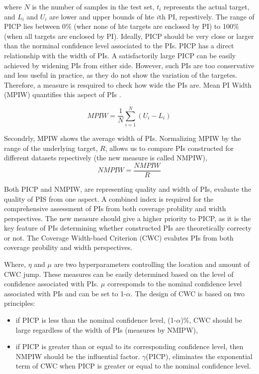 \documentclass[review]{elsarticle}
\begin{document}
      where $N$ is the number of samples in the test set, $t_{i}$ represents the actual target, and $L_{i}$ and $U_{i}$ are lower and upper bounds of hte $i$th PI, repestively. The range of PICP lies between 0$\%$ (wher none of hte targets are enclosed by PI) to 100$\%$ (when all targets are enclosed by PI). Ideally, PICP should be very close or larger than the norminal confidence level associated to the PIs.
      PICP has a direct relationship with the width of PIs. A satisfactorily large PICP can be easily achieved by widening PIs from either side. However, such PIs are too conservative and less useful in practice, as they do not show the variation of the targetes. Therefore, a measure is resquired to check how wide the PIs are. Mean PI Width (MPIW) quantifies this aspect of PIs \cite{Khosravi2010}.

      \begin{equation}
        MPIW = \frac{1}{N} \sum_{i=1}^{N} (U_{i}-L_{i})
        \label{eq.MPIW}
      \end{equation}

      Secondrly, MPIW shows the average width of PIs. Normalizing MPIW by the range of the underlying target, $R$, allows us to compare PIs constructed for different datasets repectively (the new measure is called NMPIW),
      \begin{equation}
        NMPIW = \frac{NMPIW}{R}
        \label{eq.NMPIW}
      \end{equation}

      Both PICP and NMPIW, are representing quality and width of PIs, evaluate the quality of PIS from one aspect. A combined index is required for the comprehensive assessment of PIs from both coverage probility and width perspectives. The new measure should give a higher priority to PICP, as it is the key feature of PIs determining whether constructed PIs are theoretically correcty or not. The Coverage Width-baed Criterion (CWC) evalutes PIs from both coverage probility and width perspectives.

      Where, $\eta$ and $\mu$ are two hyperparameters controlling the location and amount of CWC jump. These measures can be easily determined based on the level of confidence associated with PIs. $\mu$ correspomds to the nominal confidence level associated with PIs and can be set to 1-$\alpha$. The design of CWC is based on two principles:

      \begin{itemize}
        \item if PICP is less than the nominal confidence level, (1-$\alpha$)$\%$, CWC should be large regardless of the width of PIs (measures by NMIPW),
        \item if PICP is greater than or equal to its corresponding confidence level, then NMPIW should be the influential factor. $\gamma$(PICP), eliminates the exponential term of CWC when PICP is greater or equal to the nominal confidence level.
      \end{itemize}
\end{document}

